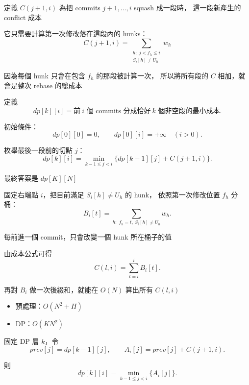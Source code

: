 \begin{frame}{}
    定義 $C(j+1,i)$ 為把 commits $j+1,\ldots,i$ squash 成一段時，
    這一段新產生的 conflict 成本

    它只需要計算第一次修改落在這段內的 hunks：
    \[
        \boxed{
        C(j+1,i)=
        \sum_{\substack{h:\;j<f_h\le i\\S_i[h]\neq U_h}} w_h
        }
    \]

    因為每個 hunk 只會在包含 $f_h$ 的那段被計算一次，
    所以將所有段的 $C$ 相加，就會是整次 rebase 的總成本
\end{frame}

\begin{frame}{}
    定義
    \[
        dp[k][i]
        =\text{前}\ i\text{ 個 commits 分成恰好}\ k\text{ 個非空段的最小成本}.
    \]

    初始條件：
    \[
        dp[0][0]=0,\qquad dp[0][i]=+\infty\quad(i>0).
    \]
\end{frame}

\begin{frame}{}
    枚舉最後一段前的切點 $j$：
    \[
        dp[k][i]
        =\min_{k-1\le j<i}
        \bigl\{dp[k-1][j]+C(j+1,i)\bigr\}.
    \]

    最終答案是 $dp[K][N]$
\end{frame}

\begin{frame}{}
    固定右端點 $i$，把目前滿足 $S_i[h]\neq U_h$ 的 hunk，
    依照第一次修改位置 $f_h$ 分桶：
    \[
        B_i[t]=\sum_{h:\;f_h=t,\ S_i[h]\neq U_h}w_h.
    \]

    每前進一個 commit，只會改變一個 hunk 所在桶子的值
\end{frame}

\begin{frame}{}
    由成本公式可得
    \[
        C(l,i)=\sum_{t=l}^{i} B_i[t].
    \]

    再對 $B_i$ 做一次後綴和，就能在 $O(N)$ 算出所有 $C(l,i)$

    \begin{itemize}
        \item 預處理：$O(N^2+H)$
        \item DP：$O(KN^2)$
    \end{itemize}
\end{frame}

\begin{frame}{}
    固定 DP 層 $k$，令
    \[
        prev[j]=dp[k-1][j],
        \qquad
        A_i[j]=prev[j]+C(j+1,i).
    \]

    則
    \[
        dp[k][i]=\min_{k-1\le j<i}{\{A_i[j]\}}.
    \]
\end{frame}

